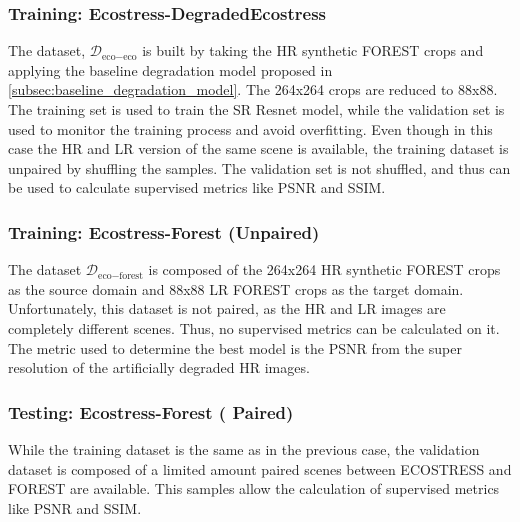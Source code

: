         \subsubsection{Training: Ecostress-DegradedEcostress}
            The dataset, $\mathcal{D}_{\text{eco}-\text{eco}}$ is built by taking the HR synthetic FOREST crops and applying the baseline degradation model proposed in \ref{subsec:baseline_degradation_model}. 
            The 264x264 crops are reduced to 88x88. The training set is used to train the SR Resnet model, while the validation set is used to monitor the training process and avoid overfitting. 
            Even though in this case the HR and LR version of the same scene is available, the training dataset is unpaired by shuffling the samples.
            The validation set is not shuffled, and thus can be used to calculate supervised metrics like PSNR and SSIM.
        
        \subsubsection{Training: Ecostress-Forest (Unpaired)}
            The dataset $\mathcal{D}_{\text{eco}-\text{forest}}$ is composed of the 264x264 HR synthetic FOREST crops as the source domain and  88x88 LR FOREST crops as the target domain. 
            Unfortunately, this dataset is not paired, as the HR and LR images are completely different scenes.
            Thus, no supervised metrics can be calculated on it. The metric used to determine the best model is the PSNR from the super resolution of the artificially degraded HR images.
        
        \subsubsection{Testing: Ecostress-Forest ( Paired)}
            While the training dataset is the same as in the previous case, the validation dataset is composed of a limited amount paired scenes between ECOSTRESS and FOREST are available.
             This samples allow the calculation of supervised metrics like PSNR and SSIM.


\clearpage
